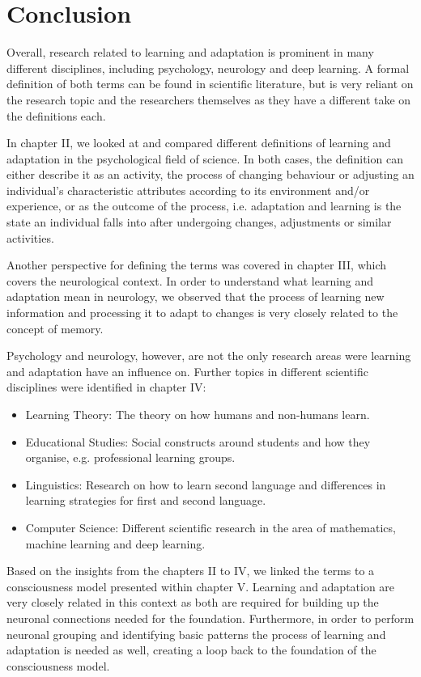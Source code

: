 \documentclass[conference]{IEEEtran}
\begin{document}
\section{Conclusion}

	Overall, research related to learning and adaptation is prominent in many different disciplines, including psychology, neurology and deep learning. A formal definition of both terms can be found in scientific literature, but is very reliant on the research topic and the researchers themselves as they have a different take on the definitions each.

	In chapter II, we looked at and compared different definitions of learning and adaptation in the psychological field of science. In both cases, the definition can either describe it as an activity, the process of changing behaviour or adjusting an individual’s characteristic attributes according to its environment and/or experience, or as the outcome of the process, i.e. adaptation and learning is the state an individual falls into after undergoing changes, adjustments or similar activities.

	Another perspective for defining the terms was covered in chapter III, which covers the neurological context. In order to understand what learning and adaptation mean in neurology, we observed that the process of learning new information and processing it to adapt to changes is very closely related to the concept of memory.

	Psychology and neurology, however,  are not the only research areas were learning and adaptation have an influence on. Further topics in different scientific disciplines were identified in chapter IV:

	\begin{itemize}
		\item Learning Theory: The theory on how humans and non-humans learn.
		\item Educational Studies: Social constructs around students and how they organise, e.g. professional learning groups.
		\item Linguistics: Research on how to learn second language and differences in learning strategies for first and second language.
		\item Computer Science: Different scientific research in the area of mathematics, machine learning and deep learning.
	\end{itemize}

	Based on the insights from the chapters II to IV, we linked the terms to a consciousness model presented within chapter V. Learning and adaptation are very closely related in this context as both are required for building up the neuronal connections needed for the foundation. Furthermore, in order to perform neuronal grouping and identifying basic patterns the process of learning and adaptation is needed as well, creating a loop back to the foundation of the consciousness model.
\end{document}

